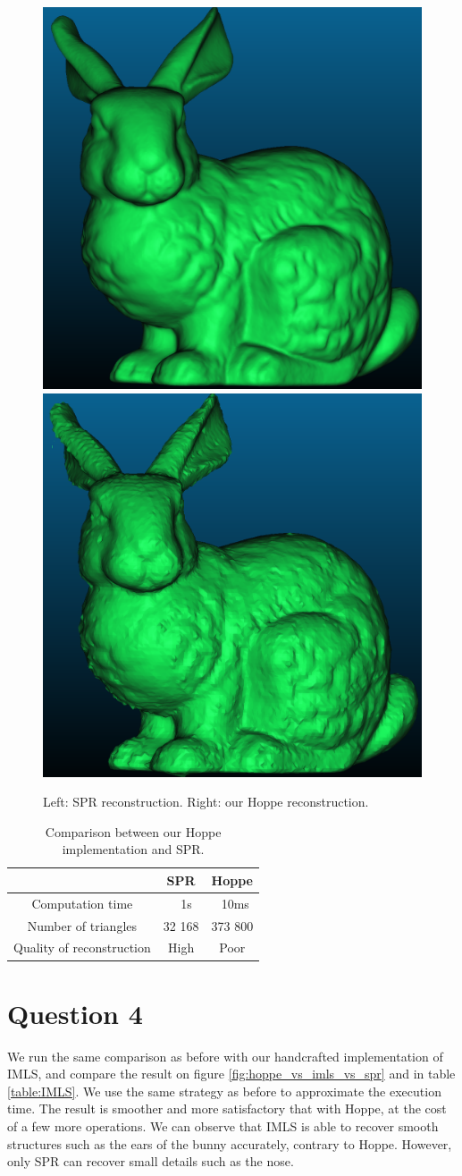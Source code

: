 \documentclass[a4paper]{article}
\begin{document}
\begin{figure}[ht]
  \centering
  \includegraphics[width=0.3\linewidth]{figures/SPR.png}
  \includegraphics[width=0.3\linewidth]{figures/Hoppe.png}
  \caption{Left: SPR reconstruction. Right: our Hoppe reconstruction.}
  \label{fig:hoppe_vs_spr}
\end{figure}

\begin{table}
    \centering
    \begin{tabular}{|c|c|c|}
      \hline
         & SPR & Hoppe \\
      \hline
      Computation time & ~ 1s & ~10ms \\
      Number of triangles & 32 168 & 373 800 \\
      Quality of reconstruction & High & Poor \\
      \hline
    \end{tabular}
    \caption{Comparison between our Hoppe implementation and SPR.}
    \label{tab:HoppeTable}
  \end{table}

\section*{Question 4}
We run the same comparison as before with our handcrafted implementation of IMLS,
and compare the result on figure \ref{fig:hoppe_vs_imls_vs_spr} and in table \ref{table:IMLS}. We use
the same strategy as before to approximate the execution time. The result is
smoother and more satisfactory that with Hoppe, at the cost of a few
more operations. We can observe that IMLS is able to recover smooth structures such
as the ears of the bunny accurately, contrary to Hoppe. However, only SPR can recover small details
such as the nose.
\end{document}

